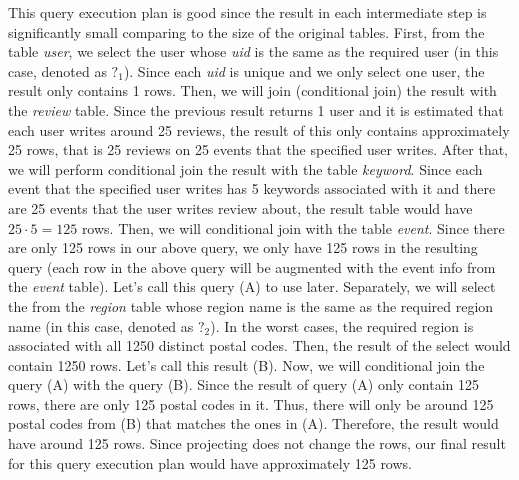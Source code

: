 \documentclass{article}
\begin{document}
\begin{enumerate}
    This query execution plan is good since the result in each intermediate step
    is significantly small comparing to the size of the original tables. First,
    from the table \emph{user}, we select the user whose \emph{uid} is the same
    as the required user (in this case, denoted as $?_1$). Since each \emph{uid}
    is unique and we only select one user, the result only contains 1 rows.
    Then, we will join (conditional join) the result with the \emph{review}
    table. Since the previous result returns 1 user and it is estimated that
    each user writes around 25 reviews, the result of this only contains
    approximately 25 rows, that is 25 reviews on 25 events that the specified
    user writes. After that, we will perform conditional join the result with
    the table \emph{keyword}. Since each event that the specified user writes
    has 5 keywords associated with it and there are 25 events that the user
    writes review about, the result table would have $25 \cdot 5 = 125$ rows.
    Then, we will conditional join with the table \emph{event}. Since there are
    only 125 rows in our above query, we only have 125 rows in the resulting
    query (each row in the above query will be augmented with the event info
    from the \emph{event} table). Let's call this query (A) to use later.
    Separately, we will select the from the \emph{region} table whose region
    name is the same as the required region name (in this case, denoted as
    $?_2$). In the worst cases, the required region is associated with all 1250
    distinct postal codes. Then, the result of the select would contain 1250
    rows. Let's call this result (B). Now, we will conditional join the query
    (A) with the query (B). Since the result of query (A) only contain 125 rows,
    there are only 125 postal codes in it. Thus, there will only be around 125
    postal codes from (B) that matches the ones in (A). Therefore, the result
    would have around 125 rows. Since projecting does not change the rows, our
    final result for this query execution plan would have approximately 125
    rows.

\end{enumerate}
\end{document}
